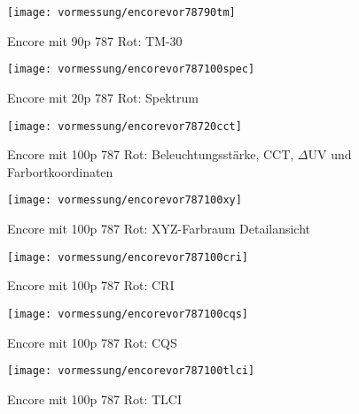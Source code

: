\documentclass[pagesize,paper=A4,fontsize=12pt,utf8,numbers=noenddot,bibliography=totoc,listof=totoc,DIV=11,BCOR=1mm]{scrreprt}
\begin{document}
\begin{figure}[htp]     %
\centering
\texttt{[image: vormessung/encorevor78790tm]} 
\caption {Encore mit 90p 787 Rot: TM-30} 
\end{figure}




\begin{figure}[htp]     %
\centering
\texttt{[image: vormessung/encorevor787100spec]} 
\caption {Encore mit 20p 787 Rot: Spektrum} 
\end{figure}

\begin{figure}[htp]     %
\centering
\texttt{[image: vormessung/encorevor78720cct]} 
\caption {Encore mit 100p 787 Rot: Beleuchtungsstärke, CCT, $\Delta$UV und Farbortkoordinaten} 
\end{figure}

\begin{figure}[htp]     %
\centering
\texttt{[image: vormessung/encorevor787100xy]} 
\caption {Encore mit 100p 787 Rot: XYZ-Farbraum Detailansicht} 
\end{figure}

\begin{figure}[htp]     %
\centering
\texttt{[image: vormessung/encorevor787100cri]} 
\caption {Encore mit 100p 787 Rot: CRI} 
\end{figure}

\begin{figure}[htp]     %
\centering
\texttt{[image: vormessung/encorevor787100cqs]} 
\caption {Encore mit 100p 787 Rot: CQS} 
\end{figure}

\begin{figure}[htp]     %
\centering
\texttt{[image: vormessung/encorevor787100tlci]} 
\caption {Encore mit 100p 787 Rot: TLCI} 
\end{figure}
\end{document}

